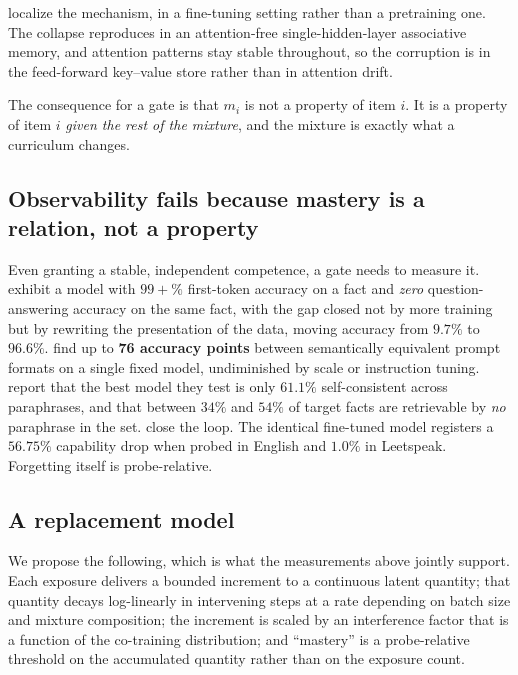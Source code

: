 \documentclass[11pt]{article}
\theoremstyle{plain}
\theoremstyle{definition}
\theoremstyle{remark}
\begin{document}
\citet{zucchet2025facts} localize the mechanism, in a fine-tuning setting rather
than a pretraining one. The collapse reproduces in an attention-free
single-hidden-layer associative memory, and attention patterns stay stable
throughout, so the corruption is in the feed-forward key--value store rather than
in attention drift.

The consequence for a gate is that $m_i$ is not a property of item $i$. It is a
property of item $i$ \emph{given the rest of the mixture}, and the mixture is
exactly what a curriculum changes.

\subsection{Observability fails because mastery is a relation, not a property}

Even granting a stable, independent competence, a gate needs to measure it.
\citet{allenzhu2024storage} exhibit a model with $99{+}\%$ first-token accuracy on
a fact and \emph{zero} question-answering accuracy on the same fact, with the gap
closed not by more training but by rewriting the presentation of the data, moving
accuracy from $9.7\%$ to $96.6\%$. \citet{sclar2024quantifying} find up to
\textbf{76 accuracy points} between semantically equivalent prompt formats on a
single fixed model, undiminished by scale or instruction tuning.
\citet{elazar2021measuring} report that the best model they test is only $61.1\%$
self-consistent across paraphrases, and that between $34\%$ and $54\%$ of target
facts are retrievable by \emph{no} paraphrase in the set. \citet{kotha2024understanding}
close the loop. The identical fine-tuned model registers a $56.75\%$ capability
drop when probed in English and $1.0\%$ in Leetspeak. Forgetting itself is
probe-relative.

\subsection{A replacement model}

We propose the following, which is what the measurements above jointly support.
Each exposure delivers a bounded increment to a continuous latent quantity; that
quantity decays log-linearly in intervening steps at a rate depending on batch
size and mixture composition; the increment is scaled by an interference factor
that is a function of the co-training distribution; and ``mastery'' is a
probe-relative threshold on the accumulated quantity rather than on the exposure
count.
\end{document}
